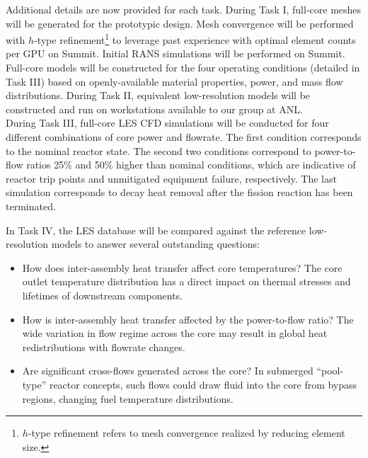 Additional details are now provided for each task. During Task I, full-core
meshes will be generated for the prototypic design. Mesh convergence will be
performed with \(h\)-type refinement\footnote{$h$-type refinement refers to
mesh convergence realized by reducing element size.} to leverage past
experience with optimal element counts per GPU on Summit. Initial RANS
simulations will be performed on Summit.  Full-core models will be constructed
for the four operating conditions (detailed in Task III) based on
openly-available material properties, power, and mass flow distributions.
During Task II, equivalent low-resolution models will be constructed and run on
workstations available to our group at ANL.
\\[-5ex]

During Task III, full-core LES CFD simulations will be conducted for four
different combinations of core power and flowrate. The first condition
corresponds to the nominal reactor state. The second two conditions correspond
to power-to-flow ratios 25\% and 50\% higher than nominal conditions, which are
indicative of reactor trip points \cite{chaumont} and unmitigated equipment
failure, respectively. The last simulation corresponds to decay heat removal
after the fission reaction has been terminated.

In Task IV, the LES database will be compared against the reference low-resolution models to answer several outstanding questions: \\[-5ex]

\vspace{-.15in}
\begin{itemize}
\item How does inter-assembly heat transfer affect core temperatures? The core
      outlet temperature distribution has a direct impact on thermal stresses and
      lifetimes of downstream components.  
\\[-4.5ex]
\item How is inter-assembly heat transfer affected by the power-to-flow ratio?
      The wide variation in flow regime across the core may result in global heat
      redistributions with flowrate changes.  
\\[-4.5ex]
\item Are significant cross-flows generated across the core? In submerged
    ``pool-type'' reactor concepts, such flows could draw fluid into the core from
    bypass regions, changing fuel temperature distributions.  
\\[-4.5ex]
\end{itemize}
\vspace{-.15in}

